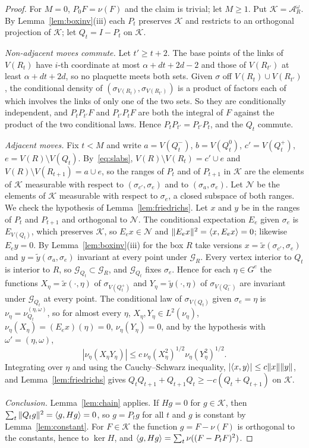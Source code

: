 \begin{proof}
For $M=0$, $P_0F=\nu(F)$ and the claim is trivial; let $M\ge1$. Put
$\mathcal K=\mathcal A^\omega_R$. By Lemma~\ref{lem:boxinv}(iii) each $P_t$
preserves $\mathcal K$ and restricts to an orthogonal projection of
$\mathcal K$; let $Q_t=I-P_t$ on $\mathcal K$.

\emph{Non-adjacent moves commute.} Let $t'\ge t+2$. The base points of the
links of $V(R_t)$ have $i$-th coordinate at most $\alpha+dt+2d-2$ and those
of $V(R_{t'})$ at least $\alpha+dt+2d$, so no plaquette meets both sets.
Given $\sigma$ off $V(R_t)\cup V(R_{t'})$, the conditional density of
$(\sigma_{V(R_t)},\sigma_{V(R_{t'})})$ is a product of factors each of which
involves the links of only one of the two sets. So they are conditionally
independent, and $P_tP_{t'}F$ and $P_{t'}P_tF$ are both the integral of $F$
against the product of the two conditional laws. Hence $P_tP_{t'}=
P_{t'}P_t$, and the $Q_t$ commute.

\emph{Adjacent moves.} Fix $t<M$ and write $a=V(Q_t^-)$, $b=V(Q_t^0)$,
$c'=V(Q_t^+)$, $e=V(R)\setminus V(Q_t)$. By~\eqref{eq:slabs},
$V(R)\setminus V(R_t)=c'\cup e$ and $V(R)\setminus V(R_{t+1})=a\cup e$, so
the ranges of $P_t$ and of $P_{t+1}$ in $\mathcal K$ are the elements of
$\mathcal K$ measurable with respect to $(\sigma_{c'},\sigma_e)$ and to
$(\sigma_a,\sigma_e)$. Let $\mathcal N$ be the elements of $\mathcal K$
measurable with respect to $\sigma_e$, a closed subspace of both ranges. We
check the hypothesis of Lemma~\ref{lem:friedrichs}. Let $x$ and $y$ be in
the ranges of $P_t$ and $P_{t+1}$ and orthogonal to $\mathcal N$. The
conditional expectation $E_e$ given $\sigma_e$ is $E_{V(Q_t)}$, which
preserves $\mathcal K$, so $E_ex\in\mathcal N$ and $\|E_ex\|^2=\langle x,E_ex\rangle=0$;
likewise $E_ey=0$. By Lemma~\ref{lem:boxinv}(iii) for the box $R$ take
versions $x=\tilde x(\sigma_{c'},\sigma_e)$ and $y=\tilde y(\sigma_a,\sigma_e)$
invariant at every point under $\mathcal G_R$. Every vertex interior to $Q_t$
is interior to $R$, so $\mathcal G_{Q_t}\subset\mathcal G_R$, and
$\mathcal G_{Q_t}$ fixes $\sigma_e$. Hence for each $\eta\in G^e$ the
functions $X_\eta=\tilde x(\cdot,\eta)$ of $\sigma_{V(Q^+_t)}$ and $Y_\eta=
\tilde y(\cdot,\eta)$ of $\sigma_{V(Q^-_t)}$ are invariant under
$\mathcal G_{Q_t}$ at every point. The conditional law of $\sigma_{V(Q_t)}$
given $\sigma_e=\eta$ is $\nu_\eta=\nu^{(\eta,\omega)}_{Q_t}$, so for almost
every $\eta$, $X_\eta,Y_\eta\in L^2(\nu_\eta)$, $\nu_\eta(X_\eta)=(E_ex)(\eta)
=0$, $\nu_\eta(Y_\eta)=0$, and by the hypothesis with $\omega'=(\eta,\omega)$,
\[
|\nu_\eta(X_\eta Y_\eta)|\le c\,\nu_\eta(X_\eta^2)^{1/2}\nu_\eta(Y_\eta^2)^{1/2}.
\]
Integrating over $\eta$ and using the Cauchy--Schwarz inequality,
$|\langle x,y\rangle|\le c\|x\|\|y\|$, and Lemma~\ref{lem:friedrichs} gives
$Q_tQ_{t+1}+Q_{t+1}Q_t\ge-c(Q_t+Q_{t+1})$ on $\mathcal K$.

\emph{Conclusion.} Lemma~\ref{lem:chain} applies. If $Hg=0$ for $g\in
\mathcal K$, then $\sum_t\|Q_tg\|^2=\langle g,Hg\rangle=0$, so $g=P_tg$ for all $t$ and
$g$ is constant by Lemma~\ref{lem:constant}. For $F\in\mathcal K$ the
function $g=F-\nu(F)$ is orthogonal to the constants, hence to $\ker H$, and
$\langle g,Hg\rangle=\sum_t\nu((F-P_tF)^2)$.
\end{proof}

